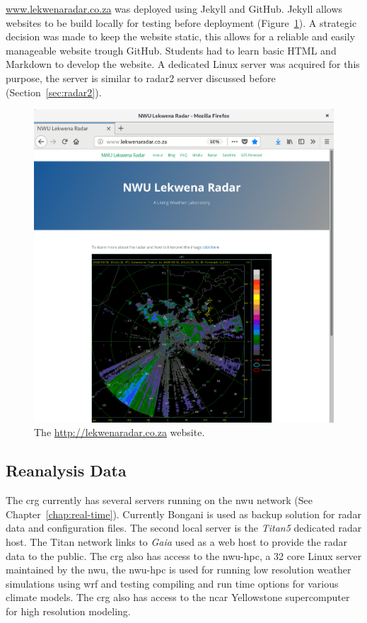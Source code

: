 \documentclass{wrcreport}
\begin{document}
\url{www.lekwenaradar.co.za} was deployed using Jekyll and GitHub.
Jekyll allows websites to be build locally for testing before
deployment (Figure~\ref{fig:website}). A strategic decision was made
to keep the website static, this allows for a reliable and easily
manageable website trough GitHub. Students had to learn basic HTML and
Markdown to develop the website. A dedicated Linux server was acquired
for this purpose, the server is similar to radar2 server discussed
before (Section~\ref{sec:radar2}).

\begin{figure}[!htp]
\includegraphics[width=\textwidth]{website1.png}
  \caption[The http://lekwenaradar.co.za website.]{The \url{http://lekwenaradar.co.za} website.}
 \label{fig:website}
\end{figure}


\subsection{Reanalysis Data}

The \gls{crg} currently has several servers
running on the \gls{nwu} network (See Chapter~\ref{chap:real-time}).
Currently Bongani is used as backup solution for radar data and
configuration files. The second local server is the \textit{Titan5}
dedicated radar host. The Titan network links to \textit{Gaia} used as
a web host to provide the radar data to the public. The \gls{crg} also
has access to the \gls{nwu-hpc}, a 32 core Linux server maintained by
the \gls{nwu}, the \gls{nwu-hpc} is used for running low resolution
weather simulations using \gls{wrf} and testing compiling and run time
options for various climate models.  The \gls{crg} also has access to
the \gls{ncar} Yellowstone supercomputer for high resolution modeling.
\end{document}
